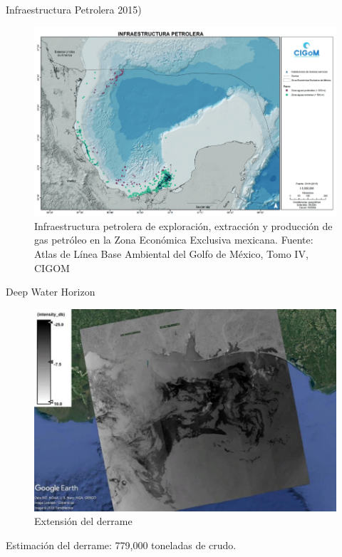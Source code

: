 \begin{frame}{Infraestructura Petrolera 2015)}
    \begin{figure}
        \centering
        \includegraphics[scale=0.3]{img/section_01/infraestructura_petrolera}
        \caption{Infraestructura petrolera de exploración, extracción y producción de gas petróleo en la Zona Económica Exclusiva mexicana. Fuente: Atlas de Línea Base Ambiental del Golfo de México, Tomo IV, CIGOM}
        \label{fig:section_01_infraestructura}
    \end{figure}
\end{frame}

\begin{frame}{Deep Water Horizon}
    \begin{figure}
        \centering
        \includegraphics[scale=0.3]{img/section_01/deep-water-horizon.jpg}
        \caption{Extensión del derrame}
        \label{fig:section_01_deep_water_horizon}
    \end{figure}

    Estimación del derrame: 779,000 toneladas de crudo.
\end{frame}

